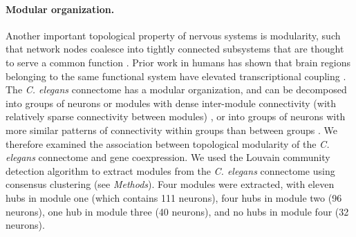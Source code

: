 \documentclass[10pt,letterpaper]{article}
\begin{document}
{\paragraph{Modular organization.}
Another important topological property of nervous systems is modularity, such that network nodes coalesce into tightly connected subsystems that are thought to serve a common function \cite{Sporns2016}.
Prior work in humans has shown that brain regions belonging to the same functional system have elevated transcriptional coupling \cite{Richiardi2015}.
The \emph{C. elegans} connectome has a modular organization, and can be decomposed into groups of neurons or modules with dense inter-module connectivity (with relatively sparse connectivity between modules) \cite{Kim2014, Pan:2010jt, Bassett2010}, or into groups of neurons with more similar patterns of connectivity within groups than between groups \cite{Achacoso:1992ay, Pavlovic2014}.
We therefore examined the association between topological modularity of the \emph{C. elegans} connectome and gene coexpression.
We used the Louvain community detection algorithm \cite{Blondel:2008do} to extract modules from the \emph{C. elegans} connectome using consensus clustering (see \textit{Methods}).
Four modules were extracted, with eleven hubs in module one (which contains 111 neurons), four hubs in module two (96 neurons), one hub in module three (40 neurons), and no hubs in module four (32 neurons).
}
\end{document}
